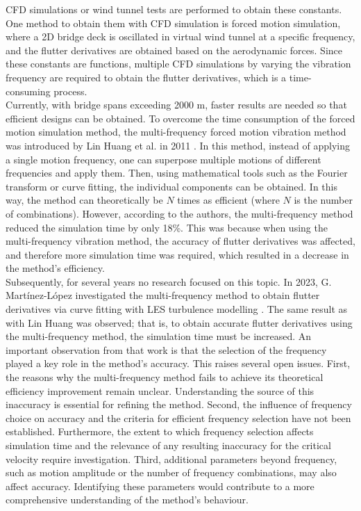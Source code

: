 \documentclass[../main]{subfiles}
\begin{document}
CFD simulations or wind tunnel tests are performed to obtain these constants. One method to obtain them with CFD simulation 
is forced motion simulation, where a 2D bridge deck is oscillated in virtual wind tunnel at a specific frequency, and the flutter derivatives are 
obtained based on the aerodynamic forces. Since these constants are functions, multiple CFD simulations by varying the vibration 
frequency are required to obtain the flutter derivatives, which is a time-consuming process. \\

Currently, with bridge spans exceeding 2000 m, faster results are needed so that efficient designs can be obtained. 
To overcome the time consumption of the forced motion simulation method, the multi-frequency forced motion vibration method 
was introduced by Lin Huang et al. in 2011 \cite{huang2011}. In this method, instead of applying a single motion frequency, 
one can superpose multiple motions of different frequencies and apply them. Then, using mathematical tools such as the 
Fourier transform or curve fitting, the individual components can be obtained. In this way, the method can theoretically be \(N\) times as 
efficient (where \(N\) is the number of combinations). However, according to the authors, the multi-frequency method reduced 
the simulation time by only 18\%. This was because when using the multi-frequency vibration method, the accuracy of flutter 
derivatives was affected, and therefore more simulation time was required, which resulted in a decrease in the method's 
efficiency. \\

Subsequently, for several years no research focused on this topic. In 2023, G. Martínez-López investigated the multi-frequency 
method to obtain flutter derivatives via curve fitting with LES turbulence modelling \cite{Martínez-López_2023}. The same result 
as with Lin Huang was observed; that is, to obtain accurate flutter derivatives using the multi-frequency method, the simulation 
time must be increased. An important observation from that work is that the selection of the frequency played a key role in the 
method's accuracy. This raises several open issues. First, the reasons why the multi-frequency method fails to achieve its 
theoretical efficiency improvement remain unclear. Understanding the source of this inaccuracy is essential for refining the 
method. Second, the influence of frequency choice on accuracy and the criteria for efficient frequency selection have not been 
established. Furthermore, the extent to which frequency selection affects simulation time and the relevance of any resulting 
inaccuracy for the critical velocity require investigation. Third, additional parameters beyond frequency, such as motion 
amplitude or the number of frequency combinations, may also affect accuracy. Identifying these parameters would contribute 
to a more comprehensive understanding of the method's behaviour.
\end{document}
